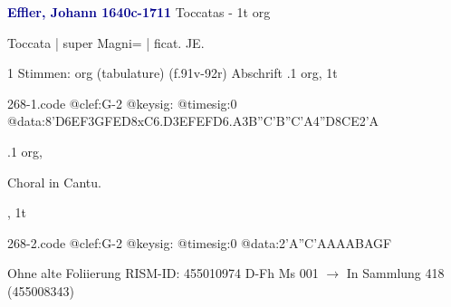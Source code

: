 \documentclass[twocolumn]{book}
\begin{document}
\newline \par \vspace{7pt} \textcolor{darkblue}{\textbf{Effler, Johann  1640c-1711}}
\newline Toccatas - 1t
\newline org
\newline \begin{itshape}[f.91v, at left:] Toccata | super Magni= | ficat. JE.\end{itshape} 
\newline \textcolor{darkblue}{}  1 Stimmen: org (tabulature)  (f.91v-92r)
\newline Abschrift
.1  org, 1t  
\begin{filecontents*}{268-1.code}
@clef:G-2
@keysig:
@timesig:0
@data:{8'D6EF}{3GFED}8xC{6.D3E}{FEFD}{6.A3B}{''C'B''C'A}4''D{8CE}2'A
\end{filecontents*}
\newline
%
.1  org, \begin{itshape}Choral in Cantu.\end{itshape}, 1t  
\begin{filecontents*}{268-2.code}
@clef:G-2
@keysig:
@timesig:0
@data:2'A''C'AAAABAGF
\end{filecontents*}
\newline
%
\newline Ohne alte Foliierung
\newline RISM-ID: 455010974
\newline D-Fh  Ms 001
\newline $\rightarrow$ In Sammlung 418 (455008343)
      
\end{document}
